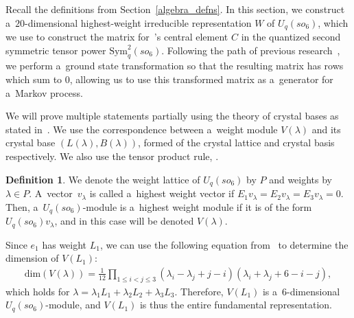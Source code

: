 \documentclass[10pt,a4paper]{amsart}
\numberwithin{equation}{section}
\theoremstyle{definition}
\newtheorem{Definition}[Theorem]{Definition}
\def\mathcal#1{#1}
\def\mathfrak#1{#1}
\begin{document}
Recall the definitions from Section~\ref{algebra_defns}. In this section, we construct a~$20$-dimensional highest-weight irreducible representation $W$ of $\mathcal{U}_q(\mathfrak{so}_6)$, which we use to construct the matrix for~\cite{kuan2020interactingparticlesystemstype}'s central element $C$ in the quantized second symmetric tensor power $\mathrm{Sym}^2_q(\mathfrak{so}_6)$. Following the path of previous research~\cite{kuan2019stochastic}, we perform a~ground state transformation so that the resulting matrix has rows which sum to $0$, allowing us to use this transformed matrix as a~generator for a~Markov process.


We will prove multiple statements partially using the theory of crystal bases as stated in~\cite{QuantumBases}. We use the correspondence between a~weight module $V(\lambda)$ and its crystal base $(\mathcal{L}(\lambda), \mathcal{B}(\lambda))$, formed of the crystal lattice and crystal basis respectively. We also use the tensor product rule, \cite[Theorem~4.4.1 on page~83 ]{QuantumBases}.

\begin{Definition}
 We denote the weight lattice of $\mathcal{U}_q(\mathfrak{so}_6)$ by $P$ and weights by $\lambda \in P$. A~vector~$v_\lambda$ is called a~highest weight vector if $E_1v_\lambda = E_2 v_\lambda = E_3v_\lambda = 0$. Then, a~$\mathcal{U}_q(\mathfrak{so}_6)$-module is a~highest weight module if it is of the form $\mathcal{U}_q(\mathfrak{so}_6)v_\lambda$, and in this case will be denoted $V(\lambda)$.
\end{Definition}
Since $e_1$ has weight $L_1$, we can use the following equation from~\cite{FultonHarris} to determine the dimension of $V(L_1)$:
\begin{align}
\label{dimensionformula}
\text{dim}(V(\lambda)) = \frac{1}{12}\prod_{1 \leq i < j \leq 3} (\lambda_i - \lambda_j +j-i)(\lambda_i+\lambda_j+6-i-j),
\end{align}
which holds for $\lambda = \lambda_1L_1 + \lambda_2L_2 + \lambda_3L_3$. Therefore, $V(L_1)$ is a~6-dimensional $\mathcal{U}_q(\mathfrak{so}_6)$-module, and $V(L_1)$ is thus the entire fundamental representation.
\end{document}
